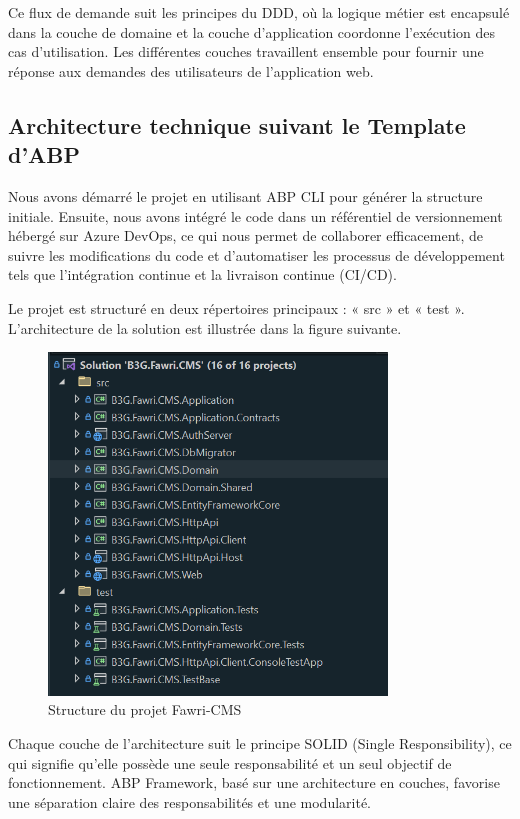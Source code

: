 Ce flux de demande suit les principes du DDD, où la logique métier est encapsulé dans la couche de domaine et la couche d'application coordonne l'exécution des cas d'utilisation. Les différentes couches travaillent ensemble pour fournir une réponse aux demandes des utilisateurs de l'application web.

\subsection{Architecture technique suivant le Template d’ABP}

\hspace{\parindent}Nous avons démarré le projet en utilisant ABP CLI pour générer la structure initiale. Ensuite, nous avons intégré le code dans un référentiel de versionnement hébergé sur Azure DevOps, ce qui nous permet de collaborer efficacement, de suivre les modifications du code et d'automatiser les processus de développement tels que l'intégration continue et la livraison continue (CI/CD).


Le projet est structuré en deux répertoires principaux : « src » et « test ». L'architecture de la solution est illustrée dans la figure suivante.



\begin{figure}[H] 
    \centering
    \includegraphics[width=9cm]{Figures/src test.PNG}
        \caption{Structure du projet Fawri-CMS}
\end{figure}


Chaque couche de l'architecture suit le principe SOLID (Single Responsibility), ce qui signifie qu'elle possède une seule responsabilité et un seul objectif de fonctionnement. ABP Framework, basé sur une architecture en couches, favorise une séparation claire des responsabilités et une modularité.

